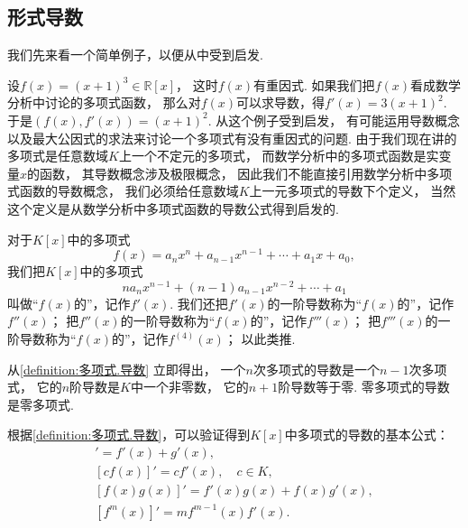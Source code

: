 \subsection{形式导数}
我们先来看一个简单例子，以便从中受到启发.

设\(f(x) = (x+1)^3 \in \mathbb{R}[x]\)，
这时\(f(x)\)有重因式.
如果我们把\(f(x)\)看成数学分析中讨论的多项式函数，
那么对\(f(x)\)可以求导数，得\(f'(x) = 3(x+1)^2\).
于是\((f(x),f'(x)) = (x+1)^2\).
从这个例子受到启发，
有可能运用导数概念以及最大公因式的求法来讨论一个多项式有没有重因式的问题.
由于我们现在讲的多项式是任意数域\(K\)上一个不定元的多项式，
而数学分析中的多项式函数是实变量\(x\)的函数，
其导数概念涉及极限概念，
因此我们不能直接引用数学分析中多项式函数的导数概念，
我们必须给任意数域\(K\)上一元多项式的导数下个定义，
当然这个定义是从数学分析中多项式函数的导数公式得到启发的.

\begin{definition}\label{definition:多项式.导数}
对于\(K[x]\)中的多项式\begin{equation*}
	f(x) = a_n x^n + a_{n-1} x^{n-1} + \dotsb + a_1 x + a_0,
\end{equation*}
我们把\(K[x]\)中的多项式\begin{equation*}
	n a_n x^{n-1} + (n-1) a_{n-1} x^{n-2} + \dotsb + a_1
\end{equation*}
叫做“\(f(x)\)的”，记作\(f'(x)\).
我们还把\(f'(x)\)的一阶导数称为“\(f(x)\)的”，记作\(f''(x)\)；
把\(f''(x)\)的一阶导数称为“\(f(x)\)的”，记作\(f'''(x)\)；
把\(f'''(x)\)的一阶导数称为“\(f(x)\)的”，记作\(f^{(4)}(x)\)；
以此类推.
\end{definition}

从\cref{definition:多项式.导数} 立即得出，
一个\(n\)次多项式的导数是一个\(n-1\)次多项式，
它的\(n\)阶导数是\(K\)中一个非零数，
它的\(n+1\)阶导数等于零.
零多项式的导数是零多项式.

根据\cref{definition:多项式.导数}，可以验证得到\(K[x]\)中多项式的导数的基本公式：\begin{gather}
	[f(x)+g(x)]' = f'(x) + g'(x), \\
	[c f(x)]' = c f'(x), \quad c \in K, \\
	[f(x) g(x)]' = f'(x) g(x) + f(x) g'(x), \\
	[f^m(x)]' = m f^{m-1}(x) f'(x).
\end{gather}


